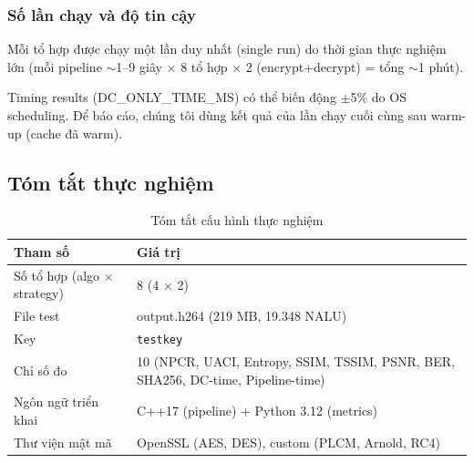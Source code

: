 \subsubsection{Số lần chạy và độ tin cậy}

Mỗi tổ hợp được chạy một lần duy nhất (single run) do thời gian thực nghiệm
lớn (mỗi pipeline $\sim$1--9 giây $\times$ 8 tổ hợp $\times$ 2 (encrypt+decrypt) = tổng $\sim$1 phút).

Timing results (DC\_ONLY\_TIME\_MS) có thể biến động $\pm$5\% do OS scheduling.
Để báo cáo, chúng tôi dùng kết quả của lần chạy cuối cùng sau warm-up (cache đã warm).

\subsection{Tóm tắt thực nghiệm}

\begin{table}[ht]
\centering
\caption{Tóm tắt cấu hình thực nghiệm}
\label{tab:exp_summary}
\begin{tabular}{ll}
\toprule
Tham số & Giá trị \\
\midrule
Số tổ hợp (algo $\times$ strategy) & 8 (4 $\times$ 2) \\
File test & output.h264 (219 MB, 19.348 NALU) \\
Key & \texttt{testkey} \\
Chỉ số đo & 10 (NPCR, UACI, Entropy, SSIM, TSSIM, PSNR, BER, SHA256, DC-time, Pipeline-time) \\
Ngôn ngữ triển khai & C++17 (pipeline) + Python 3.12 (metrics) \\
Thư viện mật mã & OpenSSL (AES, DES), custom (PLCM, Arnold, RC4) \\
\bottomrule
\end{tabular}
\end{table}
